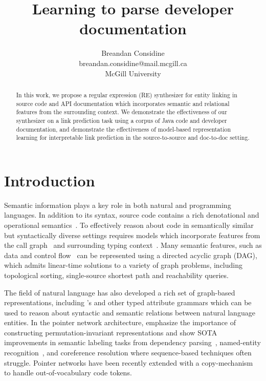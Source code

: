 \documentclass{article}
\title{Learning to parse developer documentation}
\author{Breandan Considine\\
breandan.considine@mail.mcgill.ca\\
McGill University}
\begin{document}
\maketitle

\begin{abstract}
In this work, we propose a regular expression (RE) synthesizer for entity linking in source code and API documentation which incorporates semantic and relational features from the surrounding context. We demonstrate the effectiveness of our synthesizer on a link prediction task using a corpus of Java code and developer documentation, and demonstrate the effectiveness of model-based representation learning for interpretable link prediction in the source-to-source and doc-to-doc setting.
\end{abstract}

\section{Introduction}

Semantic information plays a key role in both natural and programming languages. In addition to its syntax, source code contains a rich denotational and operational semantics~\citep{henkel2018code}. To effectively reason about code in semantically similar but syntactically diverse settings requires models which incorporate features from the call graph~\citep{gu2016deep, gu2018deep, liu2019neural} and surrounding typing context~\citep{allamanis2017learning}. Many semantic features, such as data and control flow~\citep{si2018learning} can be represented using a directed acyclic graph (DAG), which admits linear-time solutions to a variety of graph problems, including topological sorting, single-source shortest path and reachability queries.

The field of natural language has also developed a rich set of graph-based representations, including \citet{reddy2016transforming}'s and other typed attribute grammars which can be used to reason about syntactic and semantic relations between natural language entities. In the pointer network architecture, \citet{vinyals2015pointer, vinyals2015order} emphasize the importance of constructing  permutation-invariant representations and show SOTA improvements in semantic labeling tasks from dependency parsing~\citep{ma2018stack}, named-entity recognition~\citep{lample2016neural}, and coreference resolution where sequence-based techniques often struggle. Pointer networks have been recently extended with a copy-mechanism~\citep{li2017code} to handle out-of-vocabulary code tokens.
\end{document}

